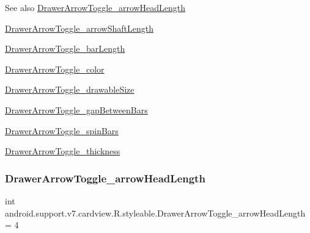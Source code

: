 \begin{DoxySeeAlso}{See also}
\hyperlink{classandroid_1_1support_1_1v7_1_1cardview_1_1R_1_1styleable_a8c10e1947477e23e8e39b04ea7b31d6d}{Drawer\+Arrow\+Toggle\+\_\+arrow\+Head\+Length} 

\hyperlink{classandroid_1_1support_1_1v7_1_1cardview_1_1R_1_1styleable_aba47177953e487458623d40854700ad5}{Drawer\+Arrow\+Toggle\+\_\+arrow\+Shaft\+Length} 

\hyperlink{classandroid_1_1support_1_1v7_1_1cardview_1_1R_1_1styleable_a40a9aac17c990350376902953712f1f3}{Drawer\+Arrow\+Toggle\+\_\+bar\+Length} 

\hyperlink{classandroid_1_1support_1_1v7_1_1cardview_1_1R_1_1styleable_ae91140445253d7469509b370ae70f855}{Drawer\+Arrow\+Toggle\+\_\+color} 

\hyperlink{classandroid_1_1support_1_1v7_1_1cardview_1_1R_1_1styleable_a6d4ecae9e68c499196ff3d66052769ef}{Drawer\+Arrow\+Toggle\+\_\+drawable\+Size} 

\hyperlink{classandroid_1_1support_1_1v7_1_1cardview_1_1R_1_1styleable_afc4238a0fa5fbdfef7ef7f8e7e7a5fd7}{Drawer\+Arrow\+Toggle\+\_\+gap\+Between\+Bars} 

\hyperlink{classandroid_1_1support_1_1v7_1_1cardview_1_1R_1_1styleable_adbe4eb7965e87739bfab8deb04a80751}{Drawer\+Arrow\+Toggle\+\_\+spin\+Bars} 

\hyperlink{classandroid_1_1support_1_1v7_1_1cardview_1_1R_1_1styleable_a9f8600b105c84f3a4e3054884f09d49e}{Drawer\+Arrow\+Toggle\+\_\+thickness} 
\end{DoxySeeAlso}
\mbox{\label{classandroid_1_1support_1_1v7_1_1cardview_1_1R_1_1styleable_a8c10e1947477e23e8e39b04ea7b31d6d}} 
\subsubsection{\texorpdfstring{Drawer\+Arrow\+Toggle\+\_\+arrow\+Head\+Length}{DrawerArrowToggle\_arrowHeadLength}}
{\footnotesize\ttfamily int android.\+support.\+v7.\+cardview.\+R.\+styleable.\+Drawer\+Arrow\+Toggle\+\_\+arrow\+Head\+Length = 4\hspace{0.3cm}{\ttfamily [static]}}

